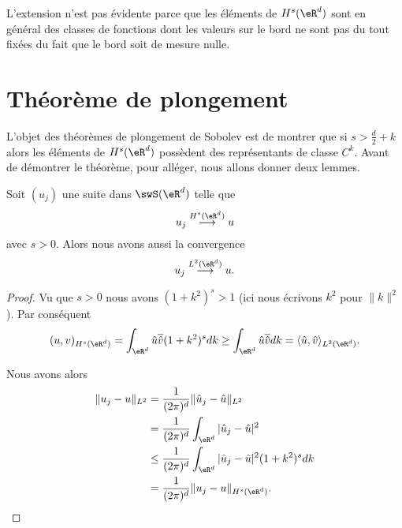 \begin{remark}
	L'extension n'est pas évidente parce que les éléments de \( H^s(\eR^d)\) sont en général des classes de fonctions dont les valeurs sur le bord ne sont pas du tout fixées du fait que le bord soit de mesure nulle.
\end{remark}

\section{Théorème de plongement}

L'objet des théorèmes de plongement de Sobolev est de montrer que si \( s>\frac{ d }{ 2 }+k\) alors les éléments de \( H^s(\eR^d)\) possèdent des représentants de classe \( C^k\). Avant de démontrer le théorème, pour alléger, nous allons donner deux lemmes.

\begin{lemma}       \label{LEMooZIBIooANHyPy}
	Soit \( (u_j)\) une suite dans \( \swS(\eR^d)\) telle que
	\begin{equation}
		u_j\stackrel{H^s(\eR^d)}{\longrightarrow}u
	\end{equation}
	avec \( s>0\). Alors nous avons aussi la convergence
	\begin{equation}
		u_j\stackrel{L^2(\eR^d)}{\longrightarrow}u.
	\end{equation}
\end{lemma}

\begin{proof}
	Vu que \( s>0\) nous avons \( (1+k^2)^s>1\) (ici nous écrivons \( k^2\) pour \( \| k \|^2\)). Par conséquent
	\begin{equation}
		(u,v)_{H^s(\eR^d)}=\int_{\eR^d}\hat u\overline{ \hat v }(1+k^2)^sdk\geq \int_{\eR^d}\hat u\overline{ \hat v }dk=\langle \hat u, \hat v\rangle_{L^2(\eR^d)}.
	\end{equation}

	Nous avons alors
	\begin{subequations}
		\begin{align}
			\| u_j-u \|_{L^2} & =\frac{1}{ (2\pi)^d }\| \hat u_j-\hat u \|_{L^2}                    \\
			                  & =\frac{1}{ (2\pi)^d }\int_{\eR^d}| \hat u_j-\hat u |^2              \\
			                  & \leq \frac{1}{(2\pi)^d}\int_{\eR^d}| \hat u_j-\hat u |^2(1+k^2)^sdk \\
			                  & =\frac{1}{ (2\pi)^d }\| u_j-u \|_{H^s(\eR^d)}.
		\end{align}
	\end{subequations}
\end{proof}

